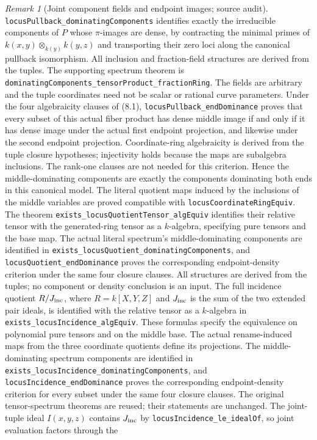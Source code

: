 \documentclass[11pt,oneside]{article}
\theoremstyle{definition}
\theoremstyle{remark}
\newtheorem{remark}[theorem]{Remark}
\newcommand{\lean}[1]{\nolinkurl{#1}}
\begin{document}
\begin{remark}[Joint component fields and endpoint images; source audit]
\lean{locusPullback_dominatingComponents} identifies exactly the irreducible
components of $P$ whose $\pi$-images are dense, by contracting the minimal primes
of $k(x,y)\otimes_{k(y)}k(y,z)$ and transporting their zero loci along the canonical
pullback isomorphism. All inclusion and fraction-field structures are derived
from the tuples. The supporting spectrum theorem is
\lean{dominatingComponents_tensorProduct_fractionRing}. The fields are arbitrary
and the tuple coordinates need not be scalar or rational curve parameters.
Under the four algebraicity clauses of (8.1),
\lean{locusPullback_endDominance} proves that every subset of this actual fiber
product has dense middle image if and only if it has dense image under the
actual first endpoint projection, and likewise under the second endpoint
projection. Coordinate-ring algebraicity is derived from the tuple closure
hypotheses; injectivity holds because the maps are subalgebra inclusions. The
rank-one clauses are not needed for this criterion. Hence the middle-dominating components are exactly
the components dominating both ends in this canonical model.
The literal quotient maps induced by the inclusions of the middle variables are
proved compatible with \lean{locusCoordinateRingEquiv}.
The theorem \lean{exists_locusQuotientTensor_algEquiv} identifies their relative
tensor with the generated-ring tensor as a $k$-algebra, specifying pure tensors
and the base map. The actual literal spectrum's middle-dominating components
are identified in \lean{exists_locusQuotient_dominatingComponents}, and
\lean{locusQuotient_endDominance} proves the corresponding endpoint-density
criterion under the same four closure clauses. All structures are derived
from the tuples; no component or density conclusion is an input.
The full incidence quotient $R/J_{\rm inc}$, where $R=k[X,Y,Z]$ and
$J_{\rm inc}$ is the sum of the two extended pair ideals, is identified with
the relative tensor as a $k$-algebra in \lean{exists_locusIncidence_algEquiv}.
These formulas specify the equivalence on polynomial pure tensors and on the middle base.
The actual rename-induced maps from the three coordinate quotients define
its projections. The middle-dominating spectrum components are identified in
\lean{exists_locusIncidence_dominatingComponents}, and
\lean{locusIncidence_endDominance} proves the corresponding endpoint-density
criterion for every subset under the same four closure clauses. The original
tensor-spectrum theorems are reused; their statements are unchanged.
The joint-tuple ideal $I(x,y,z)$ contains $J_{\rm inc}$ by
\lean{locusIncidence_le_idealOf}, so joint evaluation factors through the

\end{remark}
\end{document}
